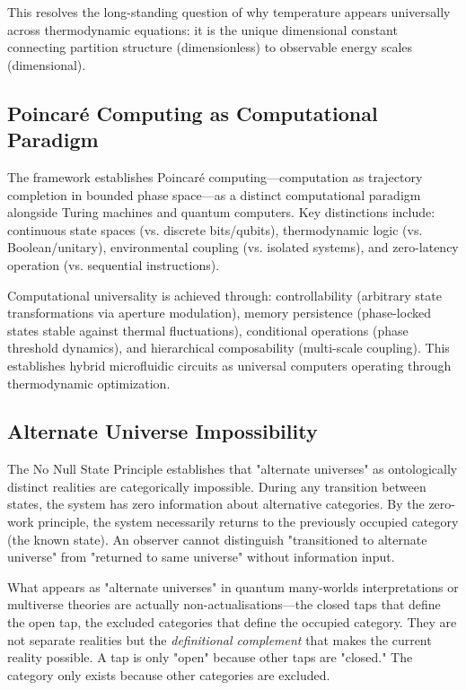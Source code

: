 \documentclass[12pt,a4paper]{article}
\theoremstyle{plain}
\theoremstyle{definition}
\theoremstyle{remark}
\begin{document}
This resolves the long-standing question of why temperature appears universally across thermodynamic equations: it is the unique dimensional constant connecting partition structure (dimensionless) to observable energy scales (dimensional).

\subsection{Poincaré Computing as Computational Paradigm}

The framework establishes Poincaré computing—computation as trajectory completion in bounded phase space—as a distinct computational paradigm alongside Turing machines and quantum computers. Key distinctions include: continuous state spaces (vs. discrete bits/qubits), thermodynamic logic (vs. Boolean/unitary), environmental coupling (vs. isolated systems), and zero-latency operation (vs. sequential instructions).

Computational universality is achieved through: controllability (arbitrary state transformations via aperture modulation), memory persistence (phase-locked states stable against thermal fluctuations), conditional operations (phase threshold dynamics), and hierarchical composability (multi-scale coupling). This establishes hybrid microfluidic circuits as universal computers operating through thermodynamic optimization.

\subsection{Alternate Universe Impossibility}

The No Null State Principle establishes that "alternate universes" as ontologically distinct realities are categorically impossible. During any transition between states, the system has zero information about alternative categories. By the zero-work principle, the system necessarily returns to the previously occupied category (the known state). An observer cannot distinguish "transitioned to alternate universe" from "returned to same universe" without information input.

What appears as "alternate universes" in quantum many-worlds interpretations or multiverse theories are actually non-actualisations—the closed taps that define the open tap, the excluded categories that define the occupied category. They are not separate realities but the \emph{definitional complement} that makes the current reality possible. A tap is only "open" because other taps are "closed." The category only exists because other categories are excluded.
\end{document}
